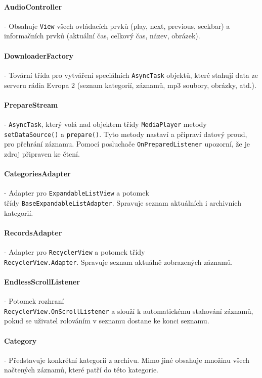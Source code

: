 \documentclass[12pt,a4paper,titlepage]{article}
\begin{document}
	\paragraph{AudioController}
	- Obsahuje \texttt{View} všech ovládacích prvků (play, next, previous, seekbar) a informačních prvků (aktuální čas, celkový čas, název, obrázek).
	
	\paragraph{DownloaderFactory}
	- Tovární třída pro vytváření speciálních \texttt{AsyncTask} objektů, které stahují data ze serveru rádia Evropa 2 (seznam kategorií, záznamů, mp3 soubory, obrázky, atd.).
	
	\paragraph{PrepareStream}
	- \texttt{AsyncTask}, který volá nad objektem třídy \texttt{MediaPlayer} metody \texttt{setDataSource()} a \texttt{prepare()}. Tyto metody nastaví a připraví datový proud, pro přehrání záznamu. Pomocí posluchače \texttt{OnPreparedListener} upozorní, že je zdroj připraven ke čtení.
	
	\paragraph{CategoriesAdapter}
	- Adapter pro \texttt{ExpandableListView} a potomek \\ třídy \texttt{BaseExpandableListAdapter}. Spravuje seznam aktuálních i archivních kategorií.

	\paragraph{RecordsAdapter}
	- Adapter pro \texttt{RecyclerView} a potomek třídy \\ \texttt{RecyclerView.Adapter}. Spravuje seznam aktuálně zobrazených záznamů.

	\paragraph{EndlessScrollListener}
	- Potomek rozhraní \\ \texttt{RecyclerView.OnScrollListener} a slouží k automatickému stahování záznamů, pokud se uživatel rolováním v seznamu dostane ke konci seznamu.
	
	\paragraph{Category}
	- Představuje konkrétní kategorii z archivu. Mimo jiné obsahuje množinu všech načtených záznamů, které patří do této kategorie.
	
\end{document}
